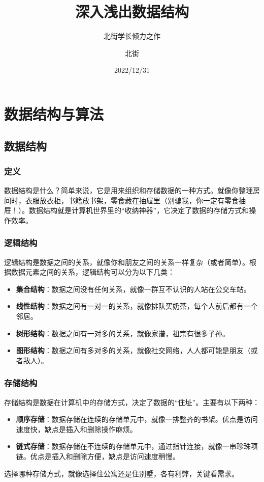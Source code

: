 \documentclass[lang=cn,newtx,10pt,scheme=chinese]{../elegantbook}
\title{深入浅出数据结构}
\subtitle{北街学长倾力之作}
\author{北街}
\date{2022/12/31}
\begin{document}
\maketitle
\frontmatter

\tableofcontents

\mainmatter

\chapter{数据结构与算法}

\section{数据结构}

\subsection{定义}
数据结构是什么？简单来说，它是用来组织和存储数据的一种方式。就像你整理房间时，衣服放衣柜，书籍放书架，零食藏在抽屉里（别骗我，你一定有零食抽屉！）。数据结构就是计算机世界里的“收纳神器”，它决定了数据的存储方式和操作效率。

\subsection{逻辑结构}
逻辑结构是数据之间的关系，就像你和朋友之间的关系一样复杂（或者简单）。根据数据元素之间的关系，逻辑结构可以分为以下几类：
\begin{itemize}
    \item \textbf{集合结构}：数据之间没有任何关系，就像一群互不认识的人站在公交车站。
    \item \textbf{线性结构}：数据之间有一对一的关系，就像排队买奶茶，每个人前后都有一个邻居。
    \item \textbf{树形结构}：数据之间有一对多的关系，就像家谱，祖宗有很多子孙。
    \item \textbf{图形结构}：数据之间有多对多的关系，就像社交网络，人人都可能是朋友（或者敌人）。
\end{itemize}

\subsection{存储结构}
存储结构是数据在计算机中的存储方式，决定了数据的“住址”。主要有以下两种：
\begin{itemize}
    \item \textbf{顺序存储}：数据存储在连续的存储单元中，就像一排整齐的书架。优点是访问速度快，缺点是插入和删除操作麻烦。
    \item \textbf{链式存储}：数据存储在不连续的存储单元中，通过指针连接，就像一串珍珠项链。优点是插入和删除方便，缺点是访问速度稍慢。
\end{itemize}
选择哪种存储方式，就像选择住公寓还是住别墅，各有利弊，关键看需求。
\end{document}
